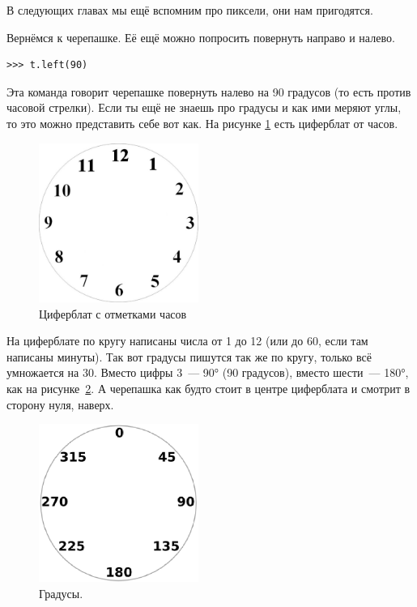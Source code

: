 В следующих главах мы ещё вспомним про пиксели, они нам пригодятся.

Вернёмся к черепашке. Её ещё можно попросить повернуть направо и налево.

\begin{listing}
\begin{verbatim}
>>> t.left(90)
\end{verbatim}
\end{listing}

Эта команда говорит черепашке повернуть налево на 90 градусов (то есть против часовой стрелки). Если ты ещё не знаешь про градусы и как ими меряют углы, то это можно представить себе вот как. На рисунке \ref{fig13} есть циферблат от часов.

\begin{figure}
\begin{center}
\includegraphics[width=52mm]{../en/figure13.eps}
\end{center}
\caption{Циферблат с отметками часов}\label{fig13}
\end{figure}

На циферблате по кругу написаны числа от 1 до 12 (или до 60, если там написаны минуты). Так вот градусы пишутся так же по кругу, только всё умножается на 30. Вместо цифры 3 — 90° (90 градусов), вместо шести — 180°, как на рисунке \ref{fig14}. А черепашка как будто стоит в центре циферблата и смотрит в сторону нуля, наверх.

\begin{figure}
\begin{center}
\includegraphics[width=52mm]{../en/figure14.eps}
\end{center}
\caption{Градусы.}\label{fig14}
\end{figure}

